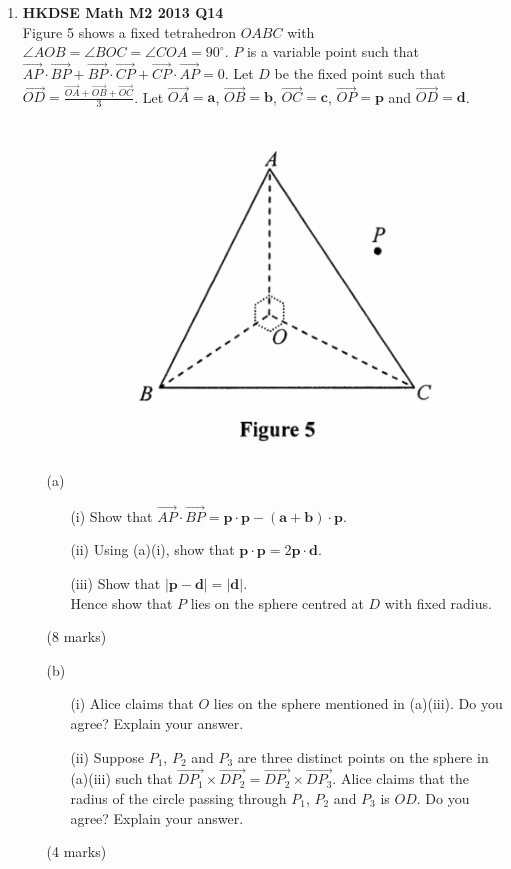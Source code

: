 \documentclass[12pt]{article}
\begin{document}
\begin{enumerate}
	\item \textbf{HKDSE Math M2 2013 Q14}\\
	Figure 5 shows a fixed tetrahedron $OABC$ with $\angle AOB = \angle BOC = \angle COA = 90^{\circ}$. $P$ is a variable point such that $\overrightarrow{AP}\cdot\overrightarrow{BP} + \overrightarrow{BP}\cdot\overrightarrow{CP} + \overrightarrow{CP}\cdot\overrightarrow{AP} = 0$. Let $D$ be the fixed point such that $\overrightarrow{OD} = \displaystyle\frac{\overrightarrow{OA}+\overrightarrow{OB}+\overrightarrow{OC}}{3}$. Let $\overrightarrow{OA} = \textbf{a}$, $\overrightarrow{OB} = \textbf{b}$, $\overrightarrow{OC} = \textbf{c}$, $\overrightarrow{OP} = \textbf{p}$ and $\overrightarrow{OD} = \textbf{d}$. 
	\begin{figure}[H]
		\centering
		\includegraphics[width = .5\linewidth]{2013Figure5}
	\end{figure}
	\begin{enumerate}
		\item [(a)]
		\begin{enumerate}
			\item [(i)]Show that $\overrightarrow{AP}\cdot\overrightarrow{BP} = \textbf{p}\cdot\textbf{p} - (\textbf{a} + \textbf{b})\cdot\textbf{p}$. 
			\item [(ii)]Using (a)(i), show that $\textbf{p}\cdot\textbf{p} = 2\textbf{p}\cdot\textbf{d}$. 
			\item [(iii)]Show that $|\textbf{p} - \textbf{d}| = |\textbf{d}|$. \\
			Hence show that $P$ lies on the sphere centred at $D$ with fixed radius.
		\end{enumerate}
		(8 marks)
		\item [(b)]
		\begin{enumerate}
			\item [(i)]Alice claims that $O$ lies on the sphere mentioned in (a)(iii). Do you agree? Explain your answer. 
			\item [(ii)]Suppose $P_1$, $P_2$ and $P_3$ are three distinct points on the sphere in (a)(iii) such that $\overrightarrow{DP_1}\times\overrightarrow{DP_2} = \overrightarrow{DP_2}\times\overrightarrow{DP_3}$. Alice claims that the radius of the circle passing through $P_1$, $P_2$ and $P_3$ is $OD$. Do you agree? Explain your answer.
		\end{enumerate}
		(4 marks)
	\end{enumerate}
\end{enumerate}
\end{document}
